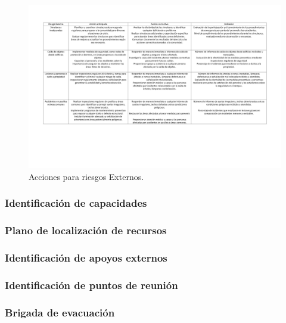      
    \begin{figure}[H]
        \centering
        \includegraphics[scale=0.150]{21/img/accionesRiesgosExternos.pdf}
        \caption{Acciones para riesgos Externos.}
        \label{fig:accionesRiesgosExternos}
    \end{figure}
    
    
    \subsubsection{Identificación de capacidades}
    
    
    
    \subsubsection{Plano de localización de recursos}
    
    
    \subsubsection{ Identificación de apoyos externos}
    
    
    \subsubsection{Identificación de puntos de reunión}
    
    \subsubsection{Brigada de evacuación}
    
